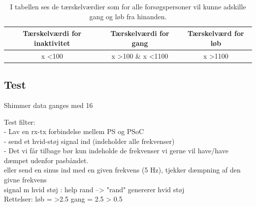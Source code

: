 \begin{table}[H]
	\centering
	\begin{tabular}{ccc}
		\hline
		\rowcolor[HTML]{C0C0C0} 
		Tærskelværdi for inaktivitet & Tærskelværdi for gang & Tærskelværd for løb \\ \hline
		x \textless 100 & x \textgreater 100 \& x \textless 1100 & x \textgreater 1100 \\ \hline
	\end{tabular}
	\caption{I tabellen ses de tærskelværdier som for alle forsøgspersoner vil kunne adskille gang og løb fra hinanden.}
	\label{tab:faelles_taerskel}
\end{table}


\subsection{Test}

Shimmer data ganges med 16


Test filter:\\
- Lav en rx-tx forbindelse mellem PS og PSoC\\
- send et hvid-støj signal ind (indeholder alle frekvenser)\\
- Det vi får tilbage bør kun indeholde de frekvenser vi gerne vil have/have dæmpet udenfor pasbåndet. \\

eller send en sinus ind med en given frekvens (5 Hz), tjekker dæmpning af den givne frekvens\\

signal m hvid støj : help rand --> "rand" genererer hvid støj\\












Rettelser:
løb = >2.5
gang = 2.5 > 0.5
